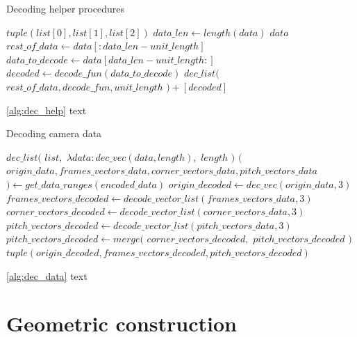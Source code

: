 \documentclass[
11pt,
twoside
]{report}
\begin{document}
\begin{algorithm}[H]
\begin{algorithmic}
\caption{Decoding helper procedures}\label{alg:dec_help}
    \Return $tuple(list[0], list[1], list[2])$
\EndProcedure
{}
    \State
    $data\_len \gets length(data)$
        \Return $data$
    \EndIf
    \State $rest\_of\_data \gets data[:data\_len - unit\_length]$
    \State $data\_to\_decode \gets data[data\_len - unit\_length:]$
    \State $decoded \gets decode\_fun(data\_to\_decode)$
    \State
    \Return $dec\_list($
            \State \indent $rest\_of\_data,decode\_fun,unit\_length$
    \State $) + [decoded]$
\EndProcedure
\end{algorithmic}
\end{algorithm}


\ref{alg:dec_help} text


\begin{algorithm}[H]
\begin{algorithmic}
\caption{Decoding camera data}\label{alg:dec_data}
    \Return $dec\_list($
        \State \indent $list,$
        \State \indent $\lambda data: dec\_vec(data, length),$
        \State \indent $length$
    \State $)$
\EndProcedure
{}
    \State $($
    \State \indent $origin\_data, frames\_vectors\_data, corner\_vectors\_data, pitch\_vectors\_data$
    \State $) \gets get\_data\_ranges(encoded\_data)$
    \State $origin\_decoded \gets dec\_vec(origin\_data, 3)$
    \State $frames\_vectors\_decoded \gets decode\_vector\_list(frames\_vectors\_data, 3)$
    \State $corner\_vectors\_decoded \gets decode\_vector\_list(corner\_vectors\_data, 3)$
    \State $pitch\_vectors\_decoded \gets decode\_vector\_list(pitch\_vectors\_data, 3)$
    \State $pitch\_vectors\_decoded \gets merge($
        \State \indent $corner\_vectors\_decoded,$
        \State \indent $pitch\_vectors\_decoded$
    \State $)$
    \State
    \Return $tuple(origin\_decoded, frames\_vectors\_decoded, pitch\_vectors\_decoded)$
\EndProcedure
\end{algorithmic}
\end{algorithm}


\ref{alg:dec_data} text


\section{Geometric construction}
\end{document}
